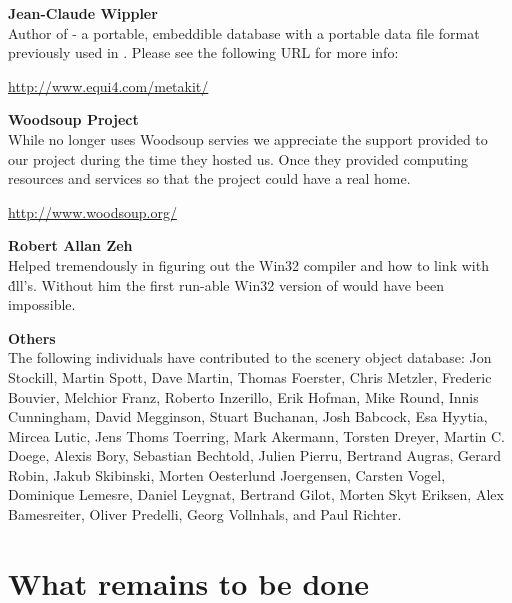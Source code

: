  \noindent \textbf{Jean-Claude Wippler}\\
  Author of  - a portable, embeddible database with a
  portable data file format previously used in \FlightGear{}. Please
  see the following URL for more info:
 \medskip

  \href{http://www.equi4.com/metakit/}{http://www.equi4.com/metakit/}
  \medskip

\noindent \textbf{Woodsoup Project}\\

  While \FlightGear{} no longer uses Woodsoup servies we appreciate the
  support provided to our project during the time they hosted us. Once they
  provided computing resources and services so that the \FlightGear{} project
  could have a real home.

\href{http://www.woodsoup.org/}{http://www.woodsoup.org/}
  \medskip

\noindent \textbf{Robert Allan Zeh}\\
  Helped tremendously in figuring out the  Win32 compiler and
  how to link with \.dll's.  Without him the first run-able Win32
  version of \FlightGear{} would have been impossible.
  \medskip

\noindent \textbf{Others}\\
The following individuals have contributed to the scenery object database:
   Jon Stockill, Martin Spott, Dave Martin, Thomas Foerster, Chris Metzler, Frederic
   Bouvier, Melchior Franz, Roberto Inzerillo, Erik Hofman, Mike Round,
   Innis Cunningham, David Megginson, Stuart Buchanan, Josh Babcock,
   Esa Hyytia, Mircea Lutic, Jens Thoms Toerring, Mark Akermann,
   Torsten Dreyer, Martin C. Doege, Alexis Bory, Sebastian Bechtold,
   Julien Pierru, Bertrand Augras, Gerard Robin, Jakub Skibinski,
   Morten Oesterlund Joergensen, Carsten Vogel, Dominique Lemesre,
   Daniel Leygnat, Bertrand Gilot, Morten Skyt Eriksen, Alex
   Bamesreiter, Oliver Predelli, Georg Vollnhals, and Paul Richter.


\section{What remains to be done}

